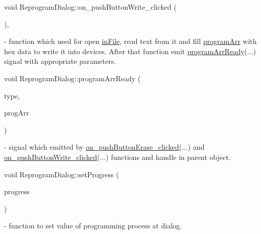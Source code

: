 \mbox{\label{classReprogramDialog_a5db4a9ac21377a1a5f39c3eaa2a27a4e}} 
{\footnotesize\ttfamily void Reprogram\+Dialog\+::\texorpdfstring{on\+\_\+push\+Button\+Write\+\_\+clicked}{on\_pushButtonWrite\_clicked} (\begin{DoxyParamCaption}{ }\end{DoxyParamCaption})\hspace{0.3cm}{\ttfamily [private]}, {\ttfamily [slot]}} - function which used for open \hyperlink{classReprogramDialog_aeb56932944b2f861acffa0ab72a5a54f}{in\+File}, read text from it and fill \hyperlink{classReprogramDialog_ae9a10d87b7aa4dea0b6068ad6c336913}{program\+Arr} with hex data to write it into devices. After that function emit \hyperlink{classReprogramDialog_a8a1f5e9816d7832931dc1da19c57b3ba}{program\+Arr\+Ready}(...) signal with appropriate parameters. 

\mbox{\label{classReprogramDialog_a8a1f5e9816d7832931dc1da19c57b3ba}} 
{\footnotesize\ttfamily void Reprogram\+Dialog\+::\texorpdfstring{program\+Arr\+Ready}{programArrReady} (\begin{DoxyParamCaption}\item[{\mbox{\hyperlink{classReprogramDialog_a95e0c039a5de1ea8d3ad44a6ccf17b6a}{Reprogram\+Dialog\+::\+Board\+Type}}}]{type,  }\item[{Q\+Byte\+Array}]{prog\+Arr }\end{DoxyParamCaption})\hspace{0.3cm}{\ttfamily [signal]}} - signal which emitted by \hyperlink{classReprogramDialog_a0180445b000071fee4185f70a264a418}{on\+\_\+push\+Button\+Erase\+\_\+clicked}(...) and \hyperlink{classReprogramDialog_a5db4a9ac21377a1a5f39c3eaa2a27a4e}{on\+\_\+push\+Button\+Write\+\_\+clicked}(...) functions and handle in parent object.

\mbox{\label{classReprogramDialog_a8aae6616889329598369a881496598ff}} 
{\footnotesize\ttfamily void Reprogram\+Dialog\+::\texorpdfstring{set\+Progress}{setProgress} (\begin{DoxyParamCaption}\item[{int}]{progress }\end{DoxyParamCaption})\hspace{0.3cm}{\ttfamily [slot]}} - function to set value of programming process at dialog.



